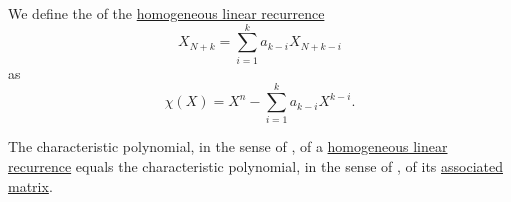 \begin{definition}\label{def:linear_recurrence_characteristic_polynomial}
  We define the  of the \hyperref[def:homogeneous_linear_recurrence]{homogeneous linear recurrence}
  \begin{equation*}
    X_{N+k} = \sum_{i=1}^k a_{k-i} X_{N+k-i}
  \end{equation*}
  as
  \begin{equation}\label{eq:def:linear_recurrence_characteristic_polynomial}
    \chi(X) = X^n - \sum_{i=1}^k a_{k-i} X^{k-i}.
  \end{equation}
\end{definition}

\begin{proposition}\label{thm:linear_recurrence_characteristic_polynomial_via_matrix}
  The characteristic polynomial, in the sense of , of a \hyperref[def:homogeneous_linear_recurrence]{homogeneous linear recurrence} equals the characteristic polynomial, in the sense of , of its \hyperref[def:homogeneous_linear_recurrence_matrix]{associated matrix}.
\end{proposition}
